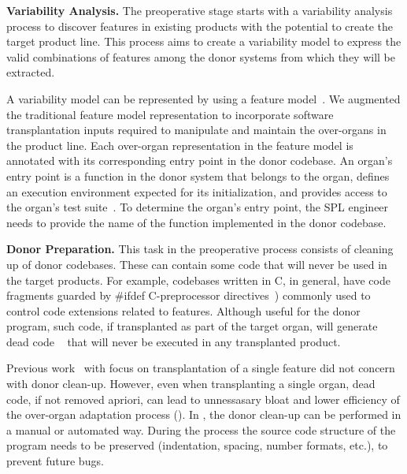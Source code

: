 

\textbf{Variability Analysis.} The preoperative stage starts with a variability analysis process to discover features in existing products with the potential to create the target product line. This process aims to create a variability model to express the valid combinations of features among the donor systems from which they will be extracted.  

A variability model can be represented by using a feature model~\cite{Kang1990}. We augmented the traditional feature model representation to incorporate software transplantation inputs required to manipulate and maintain the over-organs in the product line. Each over-organ representation in the feature model is annotated with its corresponding entry point in the donor codebase. 
An organ's entry point is a function in the donor system that belongs to the organ, defines an execution environment expected for its initialization, and provides access to the organ's test suite~\cite{Barr2015}. To determine the organ’s entry point, the SPL engineer needs to provide the name of the function implemented in the donor codebase.

\textbf{Donor Preparation.} This task in the preoperative process consists of cleaning up of donor codebases.  
These can contain some code that will never be used in the target products.
For example, codebases written in C, in general, have code fragments guarded by \#ifdef C-preprocessor directives~\cite{Tartler2011})  commonly used to control code extensions related to features. Although useful for the donor program, such code, if transplanted as part of the target organ, will generate dead code ~\cite{Tartler2011} that will never be executed in any transplanted product.  

Previous work~\cite{Barr2015} with focus on transplantation of a single feature did not concern with donor clean-up. 
However, even when transplanting a single organ, dead code, if not removed apriori, can lead to unnessasary bloat and lower efficiency of the over-organ adaptation process (). 
In \FOUNDRY, the donor clean-up can be performed in a manual or automated way. During the process the source code structure of the program needs to be preserved (indentation, spacing, number formats, etc.), to prevent future bugs. 

